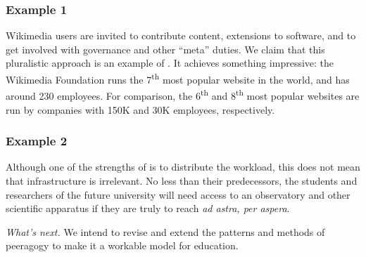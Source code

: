 \subsubsection*{Example 1} Wikimedia users are invited to contribute content, extensions to
software, and to get involved with governance and other ``meta''
duties.  We claim that this pluralistic approach is an example of
.  It achieves something impressive: the
Wikimedia Foundation runs the 7\textsuperscript{th} most popular
website in the world, and has around 230 employees.  For comparison,
the 6\textsuperscript{th} and 8\textsuperscript{th} most popular
websites are run by companies with 150K and 30K employees,
respectively.

\subsubsection*{Example 2} Although one of the strengths of  is to
distribute the workload, this does not mean that infrastructure is
irrelevant.  No less than their predecessors, the students and
researchers of the future university will need access to an
observatory and other scientific apparatus if they are truly to reach \emph{ad astra, per aspera}.

\begin{framed}
\noindent 
\emph{What's next.} We intend to revise and extend the patterns and methods of peeragogy to make it a workable model for education.
\end{framed}



  

